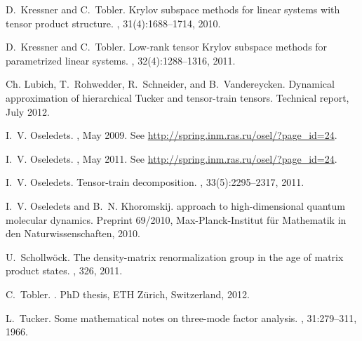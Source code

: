 \documentclass[11pt, a4paper]{article}
\begin{document}
\begin{thebibliography}{10}
D.~Kressner and C.~Tobler.
\newblock Krylov subspace methods for linear systems with tensor product
  structure.
, 31(4):1688--1714, 2010.

D.~Kressner and C.~Tobler.
\newblock Low-rank tensor {K}rylov subspace methods for parametrized linear
  systems.
, 32(4):1288--1316, 2011.

Ch. Lubich, T.~Rohwedder, R.~Schneider, and B.~Vandereycken.
\newblock Dynamical approximation of hierarchical {T}ucker and tensor-train
  tensors.
\newblock Technical report, July 2012.

I.~V. Oseledets.
, May 2009.
\newblock See \url{http://spring.inm.ras.ru/osel/?page_id=24}.

I.~V. Oseledets.
, May 2011.
\newblock See \url{http://spring.inm.ras.ru/osel/?page_id=24}.

I.~V. Oseledets.
\newblock Tensor-train decomposition.
, 33(5):2295--2317, 2011.

I.~V. Oseledets and B.~N. Khoromskij.
 approach to high-dimensional quantum molecular dynamics.
\newblock Preprint 69/2010, Max-Planck-Institut f\"ur Mathematik in den
  Naturwissenschaften, 2010.

U.~Schollw\"ock.
\newblock The density-matrix renormalization group in the age of matrix product
  states.
, 326, 2011.

C.~Tobler.
.
\newblock PhD thesis, ETH Z{\"u}rich, Switzerland, 2012.

L.~Tucker.
\newblock Some mathematical notes on three-mode factor analysis.
, 31:279--311, 1966.

\end{thebibliography}
\end{document}
